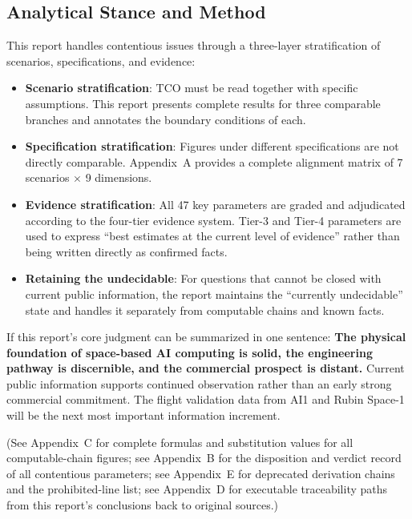 \subsection{Analytical Stance and Method}

This report handles contentious issues through a three-layer stratification of scenarios, specifications, and evidence:

\begin{itemize}[leftmargin=*]
    \item \textbf{Scenario stratification}: TCO must be read together with specific assumptions. This report presents complete results for three comparable branches and annotates the boundary conditions of each.
    \item \textbf{Specification stratification}: Figures under different specifications are not directly comparable. Appendix~A provides a complete alignment matrix of 7 scenarios $\times$ 9 dimensions.
    \item \textbf{Evidence stratification}: All 47 key parameters are graded and adjudicated according to the four-tier evidence system. Tier-3 and Tier-4 parameters are used to express ``best estimates at the current level of evidence'' rather than being written directly as confirmed facts.
    \item \textbf{Retaining the undecidable}: For questions that cannot be closed with current public information, the report maintains the ``currently undecidable'' state and handles it separately from computable chains and known facts.
\end{itemize}

If this report's core judgment can be summarized in one sentence: \textbf{The physical foundation of space-based AI computing is solid, the engineering pathway is discernible, and the commercial prospect is distant.} Current public information supports continued observation rather than an early strong commercial commitment. The flight validation data from AI1 and Rubin Space-1 will be the next most important information increment.

(See Appendix~C for complete formulas and substitution values for all computable-chain figures; see Appendix~B for the disposition and verdict record of all contentious parameters; see Appendix~E for deprecated derivation chains and the prohibited-line list; see Appendix~D for executable traceability paths from this report's conclusions back to original sources.)

\endinput
